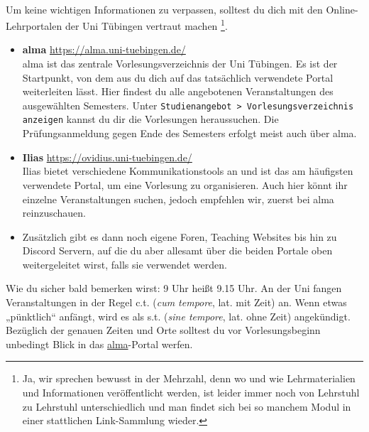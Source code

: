 ~\\

Um keine wichtigen Informationen zu verpassen, solltest du dich mit den Online-Lehrportalen der Uni Tübingen vertraut machen
\footnote{Ja, wir sprechen bewusst in der Mehrzahl, denn wo und wie Lehrmaterialien und Informationen veröffentlicht werden, ist leider immer noch 
von Lehrstuhl zu Lehrstuhl unterschiedlich und man findet sich bei so manchem Modul in einer stattlichen Link-Sammlung wieder.}.
\begin{itemize}
	\item \textbf{\hypertarget{alma}{alma}} \url{https://alma.uni-tuebingen.de/} \\
	alma ist das zentrale Vorlesungsverzeichnis der Uni Tübingen. Es ist der Startpunkt, von dem aus du dich auf das tatsächlich verwendete Portal weiterleiten lässt.
	Hier findest du alle angebotenen Veranstaltungen des ausgewählten Semesters. Unter \texttt{Studienangebot > Vorlesungsverzeichnis anzeigen} kannst du dir die Vorlesungen heraussuchen. Die Prüfungsanmeldung gegen Ende des Semesters erfolgt meist auch über alma.  
	\item \textbf{Ilias} \url{https://ovidius.uni-tuebingen.de/} \\
	Ilias bietet verschiedene Kommunikationstools an und ist das am häufigsten verwendete Portal, um eine Vorlesung zu organisieren. Auch hier könnt ihr einzelne Veranstaltungen suchen, jedoch empfehlen wir, zuerst bei alma reinzuschauen. 
	\item Zusätzlich gibt es dann noch eigene Foren, Teaching Websites bis hin zu Discord Servern, auf die du aber allesamt über die beiden Portale oben weitergeleitet wirst, falls sie verwendet werden.
	
\end{itemize}
Wie du sicher bald bemerken wirst: 9 Uhr heißt 9.15 Uhr. An der Uni fangen Veranstaltungen in der Regel c.t. (\textit{cum
tempore}, lat. \glqq mit Zeit\grqq) an. Wenn etwas „pünktlich“ anfängt, wird es als s.t. (\textit{sine tempore}, lat. \glqq ohne
Zeit\grqq) angekündigt.
Bezüglich der genauen Zeiten und Orte solltest du vor Vorlesungsbeginn unbedingt Blick in das \hyperlink{alma}{alma}-Portal werfen.


